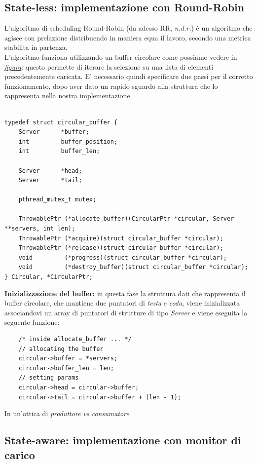 \documentclass[italian]{tktltiki2}
\begin{document}
\subsection{State-less: implementazione con Round-Robin}
L'algoritmo di scheduling Round-Robin (da adesso RR, \emph{n.d.r.}) è un algoritmo che agisce con prelazione distribuendo in maniera equa il lavoro, secondo una metrica stabilita in partenza. \\
L'algoritmo funziona utilizzando un buffer circolare come possiamo vedere in \hyperref[fig: rrobin_sl]{\emph{figura}}: questo permette di iterare la selezione su una lista di elementi precedentemente caricata. E' necessario quindi specificare due passi per il corretto funzionamento, dopo aver dato un rapido sguardo alla struttura che lo rappresenta nella nostra implementazione.\\\\
\begin{lstlisting}
typedef struct circular_buffer {
    Server      *buffer;
    int         buffer_position;
    int         buffer_len;
    
    Server      *head;
    Server      *tail;

    pthread_mutex_t mutex;

    ThrowablePtr (*allocate_buffer)(CircularPtr *circular, Server **servers, int len);
    ThrowablePtr (*acquire)(struct circular_buffer *circular);
    ThrowablePtr (*release)(struct circular_buffer *circular);
    void         (*progress)(struct circular_buffer *circular);
    void         (*destroy_buffer)(struct circular_buffer *circular);
} Circular, *CircularPtr;
\end{lstlisting}


\textbf{Inizializzazione del buffer:} in questa fase la struttura dati che rappresenta il buffer circolare, che mantiene due puntatori di \emph{testa} e \emph{coda}, viene inizializzata associandovi un array di puntatori di strutture di tipo \emph{Server} e viene eseguita la seguente funzione:
\begin{lstlisting}
    /* inside allocate_buffer ... */
    // allocating the buffer
    circular->buffer = *servers;
    circular->buffer_len = len;
    // setting params
    circular->head = circular->buffer;
    circular->tail = circular->buffer + (len - 1);
\end{lstlisting}
In un'ottica di \emph{produttore vs consumatore}
\subsection{State-aware: implementazione con monitor di carico}
\end{document}
